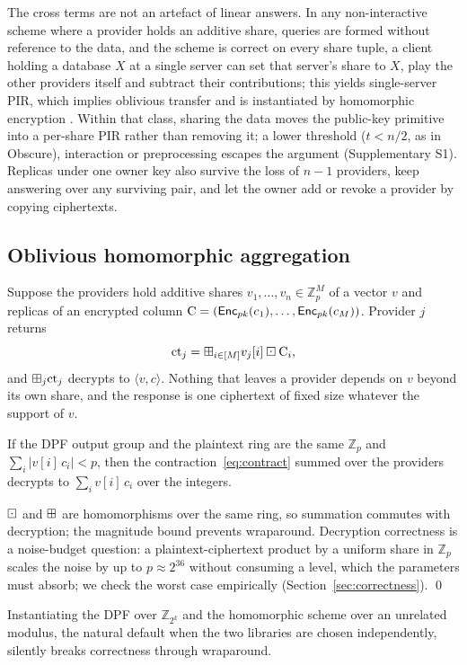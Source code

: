 The cross terms are not an artefact of linear answers. In any non-interactive
scheme where a provider holds an additive share, queries are formed without
reference to the data, and the scheme is correct on every share tuple, a client
holding a database $X$ at a single server can set that server's share to $X$,
play the other providers itself and subtract their contributions; this yields
single-server PIR, which implies oblivious transfer
\citep{dicrescenzo2000single} and is instantiated by homomorphic encryption
\citep{kushilevitz1997replication}. Within that class, sharing the data moves
the public-key primitive into a per-share PIR rather than removing it; a lower
threshold ($t<n/2$, as in Obscure), interaction or preprocessing escapes the
argument (Supplementary S1). Replicas under one owner key also survive the
loss of $n-1$ providers, keep answering over any surviving pair, and let the
owner add or revoke a provider by copying ciphertexts.

\subsection{Oblivious homomorphic aggregation}
\label{sec:oha}
Suppose the providers hold additive shares $v_1,\dots,v_n\in\mathbb{Z}_p^M$ of
a vector $v$ and replicas of an encrypted column
$\mathrm{C}=(\mathsf{Enc}_{pk}(c_1),\dots,\mathsf{Enc}_{pk}(c_M))$. Provider $j$ returns
\begin{equation}
\label{eq:contract}
\text{ct}_j=\boxplus_{i\in[M]} v_j[i]\boxdot\mathrm{C}_i ,
\end{equation}
and $\boxplus_j\text{ct}_j$ decrypts to $\langle v,c\rangle$. Nothing that leaves
a provider depends on $v$ beyond its own share, and the response is one
ciphertext of fixed size whatever the support of $v$.

\begin{lemma}
\label{lem:compat}
If the DPF output group and the plaintext ring are the same $\mathbb{Z}_p$ and
$\sum_i|v[i]\,c_i|<p$, then the contraction~\eqref{eq:contract} summed over the
providers decrypts to $\sum_i v[i]\,c_i$ over the integers.
\end{lemma}
\begin{pf}
$\boxdot$ and $\boxplus$ are homomorphisms over the same ring, so summation
commutes with decryption; the magnitude bound prevents wraparound. Decryption
correctness is a noise-budget question: a plaintext-ciphertext product by a
uniform share in $\mathbb{Z}_p$ scales the noise by up to $p\approx2^{36}$
without consuming a level, which the parameters must absorb; we check the worst
case empirically (Section~\ref{sec:correctness}). \qed
\end{pf}
Instantiating the DPF over $\mathbb{Z}_{2^k}$ and the homomorphic scheme over
an unrelated modulus, the natural default when the two libraries are chosen
independently, silently breaks correctness through wraparound.

